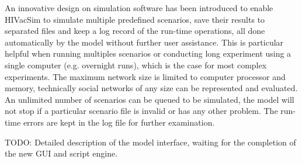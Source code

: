 An innovative design on simulation software has been introduced to enable HIVacSim to
simulate multiple predefined scenarios, save their results to separated files and keep a
log record of the run-time operations, all done automatically by the model without
further user assistance. This is particular helpful when running multiples scenarios or
conducting long experiment using a single computer (e.g. overnight runs), which is the
case for most complex experiments. The maximum network size is limited to computer
processor and memory, technically social networks of any size can be represented and
evaluated. An unlimited number of scenarios can be queued to be simulated, the model will
not stop if a particular scenario file is invalid or has any other problem. The run-time
errors are kept in the log file for further examination.


TODO: Detailed description of the model interface, waiting for the completion of the new
GUI and script engine.
